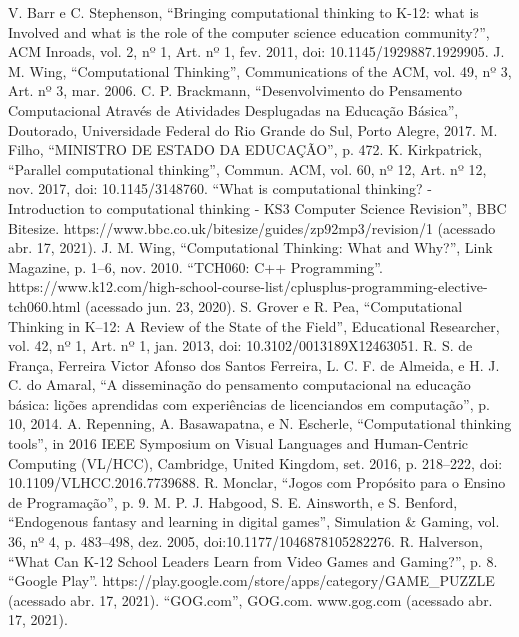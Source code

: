 \documentclass[conference]{IEEEtran}
\begin{document}
\begin{thebibliography}{23}
 V. Barr e C. Stephenson, “Bringing computational thinking to K-12: what is Involved and what is the role of the computer science education community?”, ACM Inroads, vol. 2, nº 1, Art. nº 1, fev. 2011, doi: 10.1145/1929887.1929905.
 J. M. Wing, “Computational Thinking”, Communications of the ACM, vol. 49, nº 3, Art. nº 3, mar. 2006.
 C. P. Brackmann, “Desenvolvimento do Pensamento Computacional Através de Atividades Desplugadas na Educação Básica”, Doutorado, Universidade Federal do Rio Grande do Sul, Porto Alegre, 2017.
 M. Filho, “MINISTRO DE ESTADO DA EDUCAÇÃO”, p. 472.
 K. Kirkpatrick, “Parallel computational thinking”, Commun. ACM, vol. 60, nº 12, Art. nº 12, nov. 2017, doi: 10.1145/3148760.
 “What is computational thinking? - Introduction to computational thinking - KS3 Computer Science Revision”, BBC Bitesize. https://www.bbc.co.uk/bitesize/guides/zp92mp3/revision/1 (acessado abr. 17, 2021).
 J. M. Wing, “Computational Thinking: What and Why?”, Link Magazine, p. 1–6, nov. 2010.
 “TCH060: C++ Programming”. https://www.k12.com/high-school-course-list/cplusplus-programming-elective-tch060.html (acessado jun. 23, 2020).
 S. Grover e R. Pea, “Computational Thinking in K–12: A Review of the State of the Field”, Educational Researcher, vol. 42, nº 1, Art. nº 1, jan. 2013, doi: 10.3102/0013189X12463051.
 R. S. de França, Ferreira Victor Afonso dos Santos Ferreira, L. C. F. de Almeida, e H. J. C. do Amaral, “A disseminação do pensamento computacional na educação básica: lições aprendidas com experiências de licenciandos em computação”, p. 10, 2014.
 A. Repenning, A. Basawapatna, e N. Escherle, “Computational thinking tools”, in 2016 IEEE Symposium on Visual Languages and Human-Centric Computing (VL/HCC), Cambridge, United Kingdom, set. 2016, p. 218–222, doi: 10.1109/VLHCC.2016.7739688.
 R. Monclar, “Jogos com Propósito para o Ensino de Programação”, p. 9.
 M. P. J. Habgood, S. E. Ainsworth, e S. Benford, “Endogenous fantasy and learning in digital games”, Simulation \& Gaming, vol. 36, nº 4, p. 483–498, dez. 2005, doi:10.1177/1046878105282276.
 R. Halverson, “What Can K-12 School Leaders Learn from Video Games and Gaming?”, p. 8.
 “Google Play”. https://play.google.com/store/apps/category/\linebreak GAME\_PUZZLE (acessado abr. 17, 2021).
 “GOG.com”, GOG.com. www.gog.com (acessado abr. 17, 2021).

\end{thebibliography}
\end{document}
